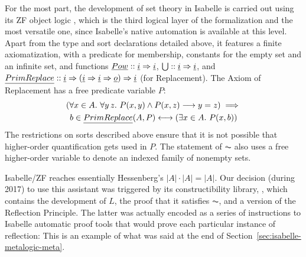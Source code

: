 For the most part, the development of set theory in Isabelle is
carried out using its ZF object logic
\cite{DBLP:journals/jar/PaulsonG96}, which is the third logical layer
of the formalization and the most versatile one, since 
Isabelle's native automation is available at this level. Apart from
the type and sort
declarations detailed above, it features a finite axiomatization,
with a predicate for membership, constants for the empty set and an
infinite set, and functions $\isa{Pow}::\tyi\fun\tyi$,
$\union::\tyi\fun\tyi$, and $\isa{PrimReplace} :: \tyi \fun (\tyi
\fun \tyi \fun\tyo)\fun \tyi$ (for Replacement). The Axiom of
Replacement
has a free predicate variable $P$: %
\begin{multline*}
  (\forall x \in A .\ \forall y\, z.\ P(x, y) \wedge P(x, z)
  \longrightarrow y=z) \implies \\
  b \in \isa{PrimReplace}(A, P)
  \longleftrightarrow(\exists x \in A .\ P(x, b)) 
\end{multline*}
The restrictions on sorts described above ensure that it is not
possible that higher-order quantification gets used in $P$. The
statement of $\AC$ also uses a free higher-order variable to denote
an indexed family of nonempty sets. %

Isabelle/ZF reaches essentially Hessenberg's $|A|\cdot|A| = |A|$. Our decision
(during 2017) to
use this assistant was triggered by its constructibility
library,  \citep{paulson_2003},
which contains the development of $L$, the proof that it satisfies
$\AC$, and a version of the Reflection Principle. The latter was
actually encoded as a series of instructions to Isabelle automatic
proof tools that would prove each particular instance of reflection:
This is an example of what was said at the end of Section~\ref{sec:isabelle-metalogic-meta}.

